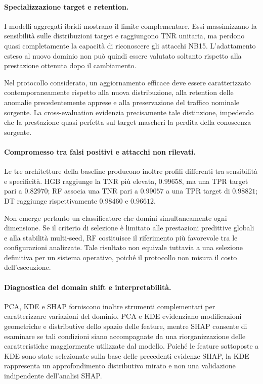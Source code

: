 \paragraph{Specializzazione target e retention.}
I modelli aggregati ibridi mostrano il limite complementare. 
Essi massimizzano la sensibilità sulle distribuzioni target e raggiungono TNR unitaria, ma perdono quasi completamente la capacità di riconoscere gli attacchi NB15. 
L'adattamento esteso al nuovo dominio non può quindi essere valutato soltanto rispetto alla prestazione ottenuta dopo il cambiamento.

Nel protocollo considerato, un aggiornamento efficace deve essere caratterizzato contemporaneamente rispetto alla nuova distribuzione, alla retention delle anomalie precedentemente apprese e alla preservazione del traffico nominale sorgente. 
La cross-evaluation evidenzia precisamente tale distinzione, impedendo che la prestazione quasi perfetta sul target mascheri la perdita della conoscenza sorgente.

\paragraph{Compromesso tra falsi positivi e attacchi non rilevati.}
Le tre architetture della baseline producono inoltre profili differenti tra sensibilità e specificità. 
HGB raggiunge la TNR più elevata, $0.99658$, ma una TPR target pari a $0.82970$; RF associa una TNR pari a $0.99057$ a una TPR target di $0.98821$; DT raggiunge rispettivamente $0.98460$ e $0.96612$.

Non emerge pertanto un classificatore che domini simultaneamente ogni dimensione. 
Se il criterio di selezione è limitato alle prestazioni predittive globali e alla stabilità multi-seed, RF costituisce il riferimento più favorevole tra le configurazioni analizzate. 
Tale risultato non equivale tuttavia a una selezione definitiva per un sistema operativo, poiché il protocollo non misura il costo dell'esecuzione.

\paragraph{Diagnostica del domain shift e interpretabilità.}
PCA, KDE e SHAP forniscono inoltre strumenti complementari per caratterizzare variazioni del dominio. 
PCA e KDE evidenziano modificazioni geometriche e distributive dello spazio delle feature, mentre SHAP consente di esaminare se tali condizioni siano accompagnate da una riorganizzazione delle caratteristiche maggiormente utilizzate dal modello. Poiché le feature sottoposte a KDE sono state selezionate sulla base delle precedenti evidenze SHAP, la KDE rappresenta un approfondimento distributivo mirato e non una validazione indipendente dell'analisi SHAP.

